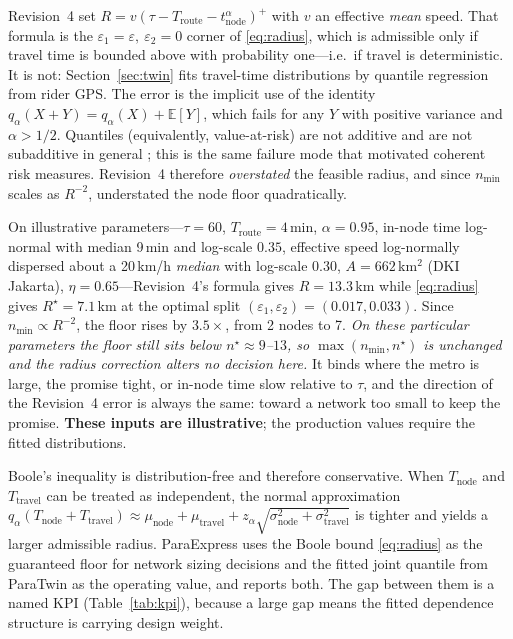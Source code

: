 \begin{remark}
Revision~4 set $R=v(\tau-T_{\mathrm{route}}-t^{\alpha}_{\mathrm{node}})^{+}$ with $v$ an effective \emph{mean} speed. That formula is the $\varepsilon_1=\varepsilon,\ \varepsilon_2=0$ corner of \eqref{eq:radius}, which is admissible only if travel time is bounded above with probability one---i.e.\ if travel is deterministic. It is not: Section~\ref{sec:twin} fits travel-time distributions by quantile regression from rider GPS. The error is the implicit use of the identity $q_\alpha(X+Y)=q_\alpha(X)+\mathbb{E}[Y]$, which fails for any $Y$ with positive variance and $\alpha>1/2$. Quantiles (equivalently, value-at-risk) are not additive and are not subadditive in general \cite{artzner1999,embrechts2002}; this is the same failure mode that motivated coherent risk measures. Revision~4 therefore \emph{overstated} the feasible radius, and since $n_{\min}$ scales as $R^{-2}$, understated the node floor quadratically.

On illustrative parameters---$\tau=60$, $T_{\mathrm{route}}=4$\,min, $\alpha=0.95$, in-node time log-normal with median 9\,min and log-scale $0.35$, effective speed log-normally dispersed about a 20\,km/h \emph{median} with log-scale $0.30$, $A=662$\,km$^2$ (DKI Jakarta), $\eta=0.65$---Revision~4's formula gives $R=13.3$\,km while \eqref{eq:radius} gives $R^\star=7.1$\,km at the optimal split $(\varepsilon_1,\varepsilon_2)=(0.017,0.033)$. Since $n_{\min}\propto R^{-2}$, the floor rises by $3.5\times$, from 2 nodes to 7. \emph{On these particular parameters the floor still sits below $n^\star\approx9$--$13$, so $\max(n_{\min},n^\star)$ is unchanged and the radius correction alters no decision here.} It binds where the metro is large, the promise tight, or in-node time slow relative to $\tau$, and the direction of the Revision~4 error is always the same: toward a network too small to keep the promise. \textbf{These inputs are illustrative}; the production values require the fitted distributions. 
\end{remark}

\begin{remark}
Boole's inequality is distribution-free and therefore conservative. When $T_{\mathrm{node}}$ and $T_{\mathrm{travel}}$ can be treated as independent, the normal approximation $q_\alpha(T_{\mathrm{node}}+T_{\mathrm{travel}})\approx\mu_{\mathrm{node}}+\mu_{\mathrm{travel}}+z_\alpha\sqrt{\sigma^2_{\mathrm{node}}+\sigma^2_{\mathrm{travel}}}$ is tighter and yields a larger admissible radius. ParaExpress uses the Boole bound \eqref{eq:radius} as the guaranteed floor for network sizing decisions and the fitted joint quantile from ParaTwin as the operating value, and reports both. The gap between them is a named KPI (Table~\ref{tab:kpi}), because a large gap means the fitted dependence structure is carrying design weight.
\end{remark}

